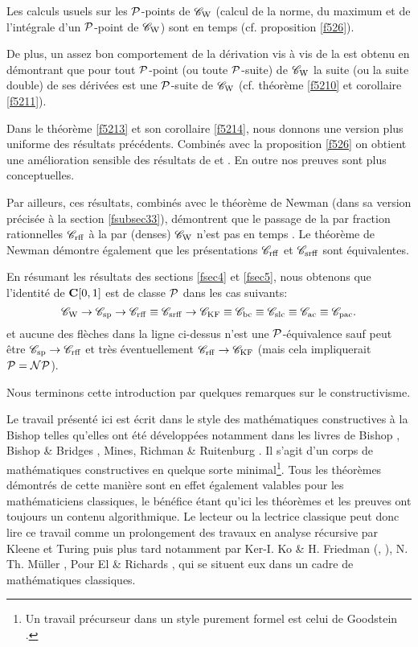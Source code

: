 \smallskip Les calculs usuels sur les ${\cal P}$-points de  ${{{\mathscr C}}_{\rm W}}$ (calcul de la norme, du maximum et de l'intégrale d'un ${\cal P}$-point de  ${{{\mathscr C}}_{\rm W}}$) sont en temps \poll (cf. proposition \ref{f526}). 

De plus, un assez bon comportement de la dérivation vis à vis de la \com est obtenu en démontrant que pour tout ${\cal P}$-point (ou toute ${\cal P}$-suite) de  ${{{\mathscr C}}_{\rm W}}$  la suite (ou la suite double) de ses dérivées est une ${\cal P}$-suite de  ${{{\mathscr C}}_{\rm W}}$ (cf. théorème \ref{f5210} et corollaire \ref{f5211}). 

Dans le théorème \ref{f5213} et son corollaire \ref{f5214}, nous 
donnons une version plus uniforme des résultats précédents. Combinés avec la proposition \ref{f526} on obtient une amélioration sensible des résultats de  \cite{fMu87}  et  \cite{fKF88}. En outre nos preuves sont plus conceptuelles. 

\smallskip Par ailleurs, ces résultats, combinés avec le théorème de Newman (dans sa version précisée à la section \ref{fsubsec33}), démontrent que le passage de la \pres par fraction rationnelles  ${{{\mathscr C}}_{\rm rff}}$  à la \pres par \pols (denses)  ${{{\mathscr C}}_{\rm W}}$ n'est pas en temps \poll. Le théorème de Newman démontre également que les présentations  ${{{\mathscr C}}_{\rm rff}}$  et  ${{{\mathscr C}}_{\rm srff}}$  sont \polt 
équivalentes. 


\bigskip En résumant les résultats des sections \ref{fsec4} et \ref{fsec5}, 
nous obtenons  que l'identité de ${{\bf C}[0,1]}$ est \uni de classe  ${\cal P}$  dans les cas suivants: 
\[
{{{\mathscr C}}_{\rm W}} \rightarrow {{{\mathscr C}}_{\rm sp}} \rightarrow {{{\mathscr C}}_{\rm rff}} \equiv {{{\mathscr C}}_{\rm srff}} 
\rightarrow {{{\mathscr C}}_{\rm KF}} \equiv {{{\mathscr C}}_{\rm bc}} \equiv {{{\mathscr C}}_{\rm slc}} \equiv {{{\mathscr C}}_{\rm ac}} 
\equiv {{{\mathscr C}}_{\rm pac}}.
\] 
et aucune des flèches dans la ligne ci-dessus n'est une ${\cal P}$-équivalence 
sauf peut être  ${{{\mathscr C}}_{\rm sp}} \rightarrow {{{\mathscr C}}_{\rm rff}} $  et très éventuellement  ${{{\mathscr C}}_{\rm rff}} 
\rightarrow {{{\mathscr C}}_{\rm KF}}$  (mais cela impliquerait ${\cal P} = {\cal NP}$).
 

\bigskip Nous terminons cette introduction par quelques remarques sur le 
constructivisme.

Le travail présenté ici est écrit dans le style des mathématiques 
constructives à la Bishop telles qu'elles ont été développées 
notamment dans les livres de Bishop \cite{fBi}, Bishop \& Bridges \cite{fBB},  
Mines, Richman \& Ruitenburg \cite{fmrr}. Il s'agit d'un corps de mathématiques constructives en quelque sorte minimal\footnote{Un travail précurseur dans un style purement formel est celui de Goodstein \cite{fGo1,fGo}.}. Tous les théorèmes 
démontrés de cette manière sont en effet également valables pour les 
mathématiciens classiques, le bénéfice étant qu'ici les théorèmes et 
les preuves ont toujours un contenu algorithmique. Le lecteur ou la lectrice classique peut donc lire ce travail comme un prolongement des travaux en analyse récursive par Kleene et Turing puis plus tard notamment par Ker-I. Ko \& H. Friedman (\cite{fKF82}, \cite{fKo91}), N. Th. Müller \cite{fMu86,fMu87}, Pour El \& Richards \cite{fPR}, qui se situent eux dans un cadre de mathématiques classiques.

